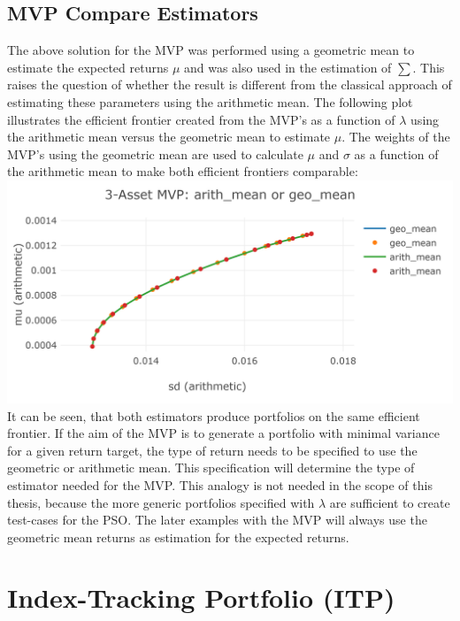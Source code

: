 \documentclass[
  oneside]{book}
\begin{document}
\hypertarget{mvp-compare-estimators}{%
\subsection{MVP Compare Estimators}\label{mvp-compare-estimators}}

The above solution for the MVP was performed using a geometric mean to estimate the expected returns \(\mu\) and was also used in the estimation of \(\textstyle\sum\). This raises the question of whether the result is different from the classical approach of estimating these parameters using the arithmetic mean. The following plot illustrates the efficient frontier created from the MVP's as a function of \(\lambda\) using the arithmetic mean versus the geometric mean to estimate \(\mu\). The weights of the MVP's using the geometric mean are used to calculate \(\mu\) and \(\sigma\) as a function of the arithmetic mean to make both efficient frontiers comparable:
\includegraphics{Master_Thesis_files/figure-latex/unnamed-chunk-4-1.png}
It can be seen, that both estimators produce portfolios on the same efficient frontier. If the aim of the MVP is to generate a portfolio with minimal variance for a given return target, the type of return needs to be specified to use the geometric or arithmetic mean. This specification will determine the type of estimator needed for the MVP. This analogy is not needed in the scope of this thesis, because the more generic portfolios specified with \(\lambda\) are sufficient to create test-cases for the PSO. The later examples with the MVP will always use the geometric mean returns as estimation for the expected returns.

\hypertarget{index-tracking-portfolio-itp}{%
\section{Index-Tracking Portfolio (ITP)}\label{index-tracking-portfolio-itp}}
\end{document}
